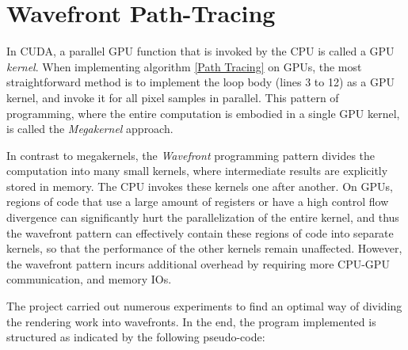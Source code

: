 


\section{Wavefront Path-Tracing}
In CUDA, a parallel GPU function that is invoked by the CPU is called a GPU \textit{kernel}. When implementing algorithm \ref{Path Tracing} on GPUs, the most straightforward method is to implement the loop body (lines 3 to 12) as a GPU kernel, and invoke it for all pixel samples in parallel. This pattern of programming, where the entire computation is embodied in a single GPU kernel, is called the \textit{Megakernel}\cite{megakernel} approach.

In contrast to megakernels, the \textit{Wavefront} programming pattern divides the computation into many small kernels, where intermediate results are explicitly stored in memory. The CPU invokes these kernels one after another. On GPUs, regions of code that use a large amount of registers or have a high control flow divergence can significantly hurt the parallelization of the entire kernel, and thus the wavefront pattern can effectively contain these regions of code into separate kernels, so that the performance of the other kernels remain unaffected. However, the wavefront pattern incurs additional overhead by requiring more CPU-GPU communication, and memory IOs.

The project carried out numerous experiments to find an optimal way of dividing the rendering work into wavefronts. In the end, the program implemented is structured as indicated by the following pseudo-code:

